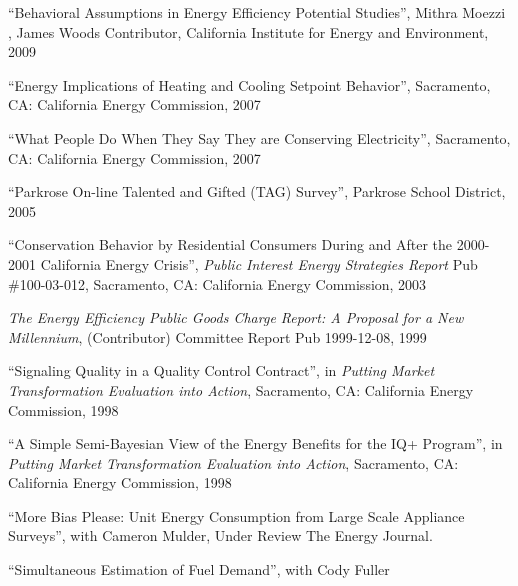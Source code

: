 \documentclass[Computer Science]{vita}
\begin{document}
\begin{vita}
\begin{Publications}
\begin{Unrefereed Public Reports}
    \item ``Behavioral Assumptions in Energy Efficiency Potential
      Studies'', Mithra Moezzi , James Woods Contributor, California
      Institute for Energy and Environment, 2009

    \item ``Energy Implications of Heating and Cooling Setpoint
      Behavior'', Sacramento, CA: California Energy Commission, 2007

    \item ``What People Do When They Say They are Conserving
      Electricity'', Sacramento, CA: California Energy Commission,
      2007

    \item ``Parkrose On-line Talented and Gifted (TAG) Survey'',
      Parkrose School District, 2005

    \item ``Conservation Behavior by Residential Consumers During and
      After the 2000-2001 California Energy Crisis'', \emph{Public
        Interest Energy Strategies Report} Pub \#100-03-012,
      Sacramento, CA: California Energy Commission, 2003

    \item \emph{The Energy Efficiency Public Goods Charge Report: A
        Proposal for a New Millennium}, (Contributor) Committee Report
      Pub 1999-12-08, 1999
	
    \item ``Signaling Quality in a Quality Control Contract'', in
      \emph{Putting Market Transformation Evaluation into Action},
      Sacramento, CA: California Energy Commission, 1998
	
    \item ``A Simple Semi-Bayesian View of the Energy Benefits for the
      IQ+ Program'', in \emph{Putting Market Transformation Evaluation
        into Action}, Sacramento, CA: California Energy Commission,
      1998
	
    \end{Unrefereed Public Reports}
  
    \begin{Work in progress}
\item ``More Bias Please: Unit Energy Consumption from Large Scale Appliance Surveys'', with Cameron Mulder, Under Review The Energy Journal.

\item ``Simultaneous Estimation of Fuel Demand'', with Cody Fuller
 

\end{Work in progress}
\end{Publications}
\end{vita}
\end{document}
